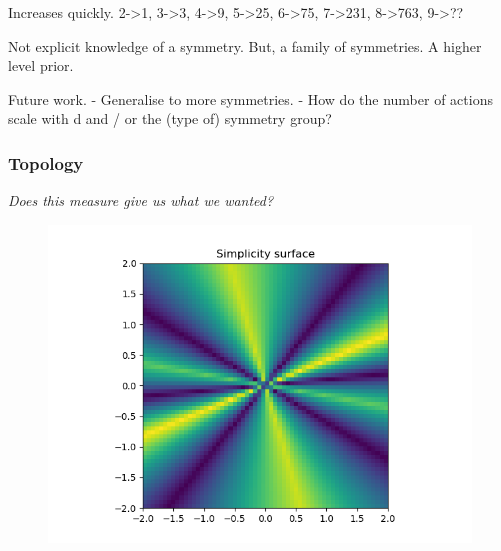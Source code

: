 Increases quickly. 2->1, 3->3, 4->9, 5->25, 6->75, 7->231, 8->763, 9->??

Not explicit knowledge of a symmetry. But, a family of symmetries. A higher level prior.

Future work.
- Generalise to more symmetries.
- How do the number of actions scale with d and / or the (type of) symmetry group?



\subsubsection{Topology}

\begin{displayquote}
\textit{Does this measure give us what we wanted?}
\end{displayquote}

\begin{figure}[h!]
\centering
\includegraphics[width=1\textwidth,height=0.5\textheight]{../../pictures/figures/complexity_surface_nd-3d.png}
\caption{}
\end{figure}

